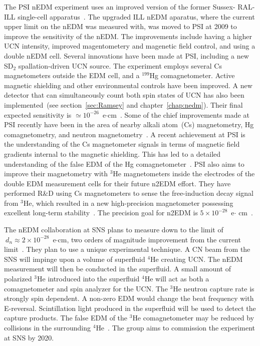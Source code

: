 The PSI nEDM experiment uses an improved version of the former Sussex-
RAL-ILL single-cell apparatus~\cite{Altarev2010}. The upgraded ILL
nEDM aparatus, where the current upper limit on the nEDM was measured
with, was moved to PSI at 2009 to improve the sensitivity of the
nEDM. The improvements include having a higher UCN intensity, improved
magentometery and magenetic field control, and using a double nEDM
cell.  Several innovations have been made at PSI, including a new
SD$_2$ spallation-driven UCN source. The experiment employs several Cs
magnetometers outside the EDM cell, and a $^{199}$Hg
comagnetometer. Active magnetic shielding and other environmental
controls have been improved. A new detector that can simultaneously
count both spin states of UCN has also been implemented~(see
section~\ref{sec:Ramsey} and chapter~\ref{chap:nedm}). Their final
expected sensitivity is
$\simeq 10^{-26}$~e$\cdot$cm~\cite{Schmidt2016}. Some of the chief
improvements made at PSI recently have been in the area of nearby
alkali atom~(Cs) magnetometry, Hg comagnetometry, and neutron
magnetometry~\cite{AFACH2014128}. A recent achievement at PSI is the
understanding of the Cs magnetometer signals in terms of magnetic
field gradients internal to the magnetic shielding. This has led to a
detailed understanding of the false EDM of the Hg
comagnetometer~\cite{Afach2015_2}.
PSI also aims to improve their magnetometry with $^3$He magnetometers
inside the electrodes of the double EDM measurement cells for their
future n2EDM effort. They have performed R\&D using Cs magnetometers
to sense the free-induction decay signal from $^3$He, which resulted
in a new high-precision magnetometer possessing excellent long-term
stability~\cite{Koch2015}. The precision goal for n2EDM is
$5 \times 10^{-28}$~e$\cdot$ cm~\cite{Bernhard_talk,baker2011search}.


The nEDM collaboration at SNS plans to measure down to the limit of
$\ d_n\approx 2 \times 10^{-28} $~e$\cdot$cm, two orders of magnitude
improvement from the current limit~\cite{peng2008neutron}.  They plan
to use a unique experimental technique. A CN beam from the SNS will
impinge upon a volume of superfluid $^4$He creating UCN. The nEDM
measurement will then be conducted in the superfluid. A small amount
of polarized $^3$He introduced into the superfluid $^4$He will act as
both a comagnetometer and spin analyzer for the UCN. The $^3$He
neutron capture rate is strongly spin dependent. A non-zero EDM would
change the beat frequency with E-reversal. Scintillation light
produced in the superfluid will be used to detect the capture
products. The false EDM of the $^3$He comagnetometer may be reduced by
collisions in the surrounding $^4$He~\cite{LamGol2005}. The group aims
to commission the experiment at SNS by 2020.


